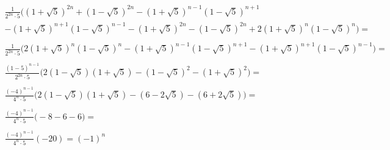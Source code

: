 \begin{gather*}
		\frac{1}{2^{2n} \cdot 5}
		\Big(
			(1+\sqrt{5})^{2n}
			+ (1-\sqrt{5})^{2n}
			- (1+\sqrt{5})^{n-1}(1-\sqrt{5})^{n+1}\\
			- (1+\sqrt{5})^{n+1}(1-\sqrt{5})^{n-1}
			- (1+\sqrt{5})^{2n}
			- (1-\sqrt{5})^{2n}
			+ 2(1+\sqrt{5})^{n}(1-\sqrt{5})^{n}
		\Big) = 
		\\	
		\\
		\frac{1}{2^{2n} \cdot 5}
		\Big(
			2(1+\sqrt{5})^{n}(1-\sqrt{5})^{n}
			- (1+\sqrt{5})^{n-1}(1-\sqrt{5})^{n+1}
			- (1+\sqrt{5})^{n+1}(1-\sqrt{5})^{n-1}
		\Big) = 
		\\	
		\\
		\frac{(1 - 5)^{n-1}}{2^{2n} \cdot 5}
		\Big(
			2 (1-\sqrt{5})(1+\sqrt{5})
			- (1-\sqrt{5})^{2}
			- (1+\sqrt{5})^{2}
		\Big) =
		\\	
		\\
		\frac{(-4)^{n-1}}{4^{n} \cdot 5}
		\Big(
			2 (1-\sqrt{5})(1+\sqrt{5})
			- (6 - 2\sqrt{5})
			- (6 + 2\sqrt{5})
		\Big) =  
		\\	
		\\
		\frac{(-4)^{n-1}}{4^{n} \cdot 5}
		\Big(
			-8
			- 6
			- 6
		\Big) =
		\\
		\\
		\frac{(-4)^{n-1}}{4^{n} \cdot 5} (-20) = 
		(-1)^{n} 
	\end{gather*}